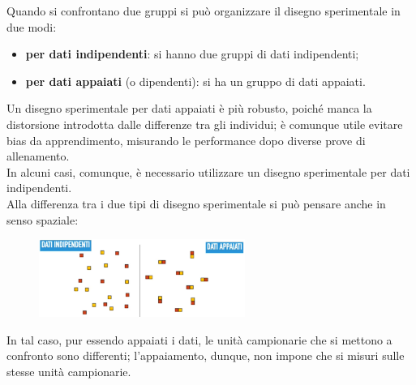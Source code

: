 \documentclass[10pt, draft]{book}
\begin{document}
Quando si confrontano due gruppi si può organizzare il disegno sperimentale in due modi:
\begin{itemize}
    \item \textbf{per dati indipendenti}: si hanno due gruppi di dati indipendenti;
    \item \textbf{per dati appaiati} (o dipendenti): si ha un gruppo di dati appaiati.
\end{itemize}
Un disegno sperimentale per dati appaiati è più robusto, poiché manca la distorsione introdotta dalle differenze tra gli individui; è comunque utile evitare bias da apprendimento, misurando le performance dopo diverse prove di allenamento.
\\
In alcuni casi, comunque, è necessario utilizzare un disegno sperimentale per dati indipendenti.
\\
Alla differenza tra i due tipi di disegno sperimentale si può pensare anche in senso spaziale:
\begin{figure}[H]\label{fig12.1-1}
    \centering
    \includegraphics[width=0.6\textwidth]{fig12.1-1}
    \caption{\small{}}
\end{figure}
In tal caso, pur essendo appaiati i dati, le unità campionarie che si mettono a confronto sono differenti; l'appaiamento, dunque, non impone che si misuri sulle stesse unità campionarie.
\end{document}
